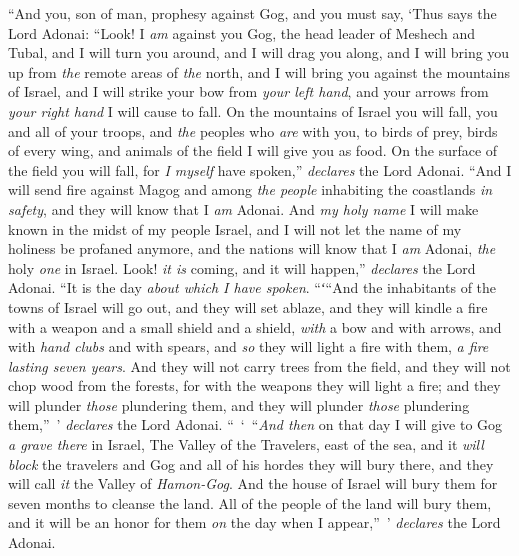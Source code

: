 \begin{biblechapter} %
 “And you, son of man, prophesy against Gog, and you must say, ‘Thus says the Lord Adonai: “Look! I \textit{am} against you Gog, the head leader of Meshech and Tubal,
\verse and I will turn you around, and I will drag you along, and I will bring you up from \textit{the} remote areas of \textit{the} north, and I will bring you against the mountains of Israel,
\verse and I will strike your bow from \textit{your left hand}, and your arrows from \textit{your right hand} I will cause to fall.
\verse On the mountains of Israel you will fall, you and all of your troops, and \textit{the} peoples who \textit{are} with you, to birds of prey, birds of every wing, and animals of the field I will give you as food.
\verse On the surface of the field you will fall, for \textit{I myself} have spoken,” \textit{declares} the Lord Adonai.
\verse “And I will send fire against Magog and among \textit{the people} inhabiting the coastlands \textit{in safety}, and they will know that I \textit{am} Adonai.
\verse And \textit{my holy name} I will make known in the midst of my people Israel, and I will not let the name of my holiness be profaned anymore, and the nations will know that I \textit{am} Adonai, \textit{the} holy \textit{one} in Israel.
\verse Look! \textit{it is} coming, and it will happen,” \textit{declares} the Lord Adonai. “It is the day \textit{about which I have spoken}.
\verse “ʻ“And the inhabitants of the towns of Israel will go out, and they will set ablaze, and they will kindle a fire with a weapon and a small shield and a shield, \textit{with} a bow and with arrows, and with \textit{hand clubs} and with spears, and \textit{so} they will light a fire with them, \textit{a fire lasting seven years}.
\verse And they will not carry trees from the field, and they will not chop wood from the forests, for with the weapons they will light a fire; and they will plunder \textit{those} plundering them, and they will plunder \textit{those} plundering them,” ’ \textit{declares} the Lord Adonai.
\verse “ ‘ “\textit{And then} on that day I will give to Gog \textit{a grave there} in Israel, The Valley of the Travelers, east of the sea, and it \textit{will block} the travelers and Gog and all of his hordes they will bury there, and they will call \textit{it} the Valley of \textit{Hamon-Gog}.
\verse And the house of Israel will bury them for seven months to cleanse the land.
\verse All of the people of the land will bury them, and it will be an honor for them \textit{on} the day when I appear,” ’ \textit{declares} the Lord Adonai.

\end{biblechapter}
